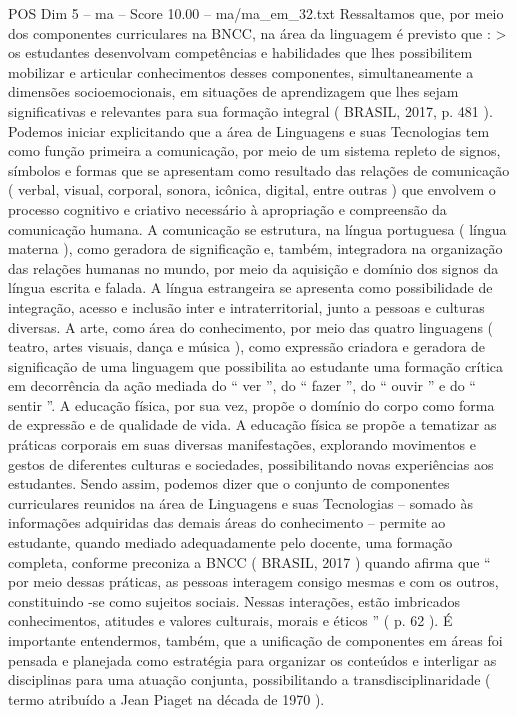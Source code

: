 \begin{textsample}{POS Dim 5 – ma – Score 10.00 – ma/ma\_em\_32.txt}
Ressaltamos que, por meio dos componentes curriculares na BNCC, na área da linguagem é previsto que : > os estudantes desenvolvam competências e habilidades que lhes possibilitem mobilizar e articular conhecimentos desses componentes, simultaneamente a dimensões socioemocionais, em situações de aprendizagem que lhes sejam significativas e relevantes para sua formação integral ( BRASIL, 2017, p. 481 ).
Podemos iniciar explicitando que a área de Linguagens e suas Tecnologias tem como função primeira a comunicação, por meio de um sistema repleto de signos, símbolos e formas que se apresentam como resultado das relações de comunicação ( verbal, visual, corporal, sonora, icônica, digital, entre outras ) que envolvem o processo cognitivo e criativo necessário à apropriação e compreensão da comunicação humana.
A comunicação se estrutura, na língua portuguesa ( língua materna ), como geradora de significação e, também, integradora na organização das relações humanas no mundo, por meio da aquisição e domínio dos signos da língua escrita e falada.
A língua estrangeira se apresenta como possibilidade de integração, acesso e inclusão inter e intraterritorial, junto a pessoas e culturas diversas.
A arte, como área do conhecimento, por meio das quatro linguagens ( teatro, artes visuais, dança e música ), como expressão criadora e geradora de significação de uma linguagem que possibilita ao estudante uma formação crítica em decorrência da ação mediada do “ ver ”, do “ fazer ”, do “ ouvir ” e do “ sentir ”.
A educação física, por sua vez, propõe o domínio do corpo como forma de expressão e de qualidade de vida.
A educação física se propõe a tematizar as práticas corporais em suas diversas manifestações, explorando movimentos e gestos de diferentes culturas e sociedades, possibilitando novas experiências aos estudantes.
Sendo assim, podemos dizer que o conjunto de componentes curriculares reunidos na área de Linguagens e suas Tecnologias – somado às informações adquiridas das demais áreas do conhecimento – permite ao estudante, quando mediado adequadamente pelo docente, uma formação completa, conforme preconiza a BNCC ( BRASIL, 2017 ) quando afirma que “ por meio dessas práticas, as pessoas interagem consigo mesmas e com os outros, constituindo -se como sujeitos sociais.
Nessas interações, estão imbricados conhecimentos, atitudes e valores culturais, morais e éticos ” ( p. 62 ).
É importante entendermos, também, que a unificação de componentes em áreas foi pensada e planejada como estratégia para organizar os conteúdos e interligar as disciplinas para uma atuação conjunta, possibilitando a transdisciplinaridade ( termo atribuído a Jean Piaget na década de 1970 ).

\end{textsample}
